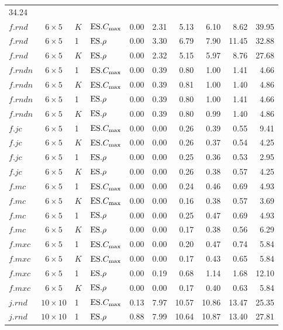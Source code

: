 \begin{table}[b]
{\begin{tabular}{lcllrrrrrr}
34.24 \\ 
$f.rnd$ & $6\times5$ & $K$ & $\text{ES}.{C_{\max}}$ & 0.00 & 2.31 & 5.13 & 6.10 & 8.62 & 
39.95 \\ 
$f.rnd$ & $6\times5$ & 1 & $\text{ES}.{\rho}$ & 0.00 & 3.30 & 6.79 & 7.90 & 11.45 & 
32.88 \\ 
$f.rnd$ & $6\times5$ & $K$ & $\text{ES}.{\rho}$ & 0.00 & 2.32 & 5.15 & 5.97 & 8.76 & 
27.68 \\ \midrule
$f.rndn$ & $6\times5$ & 1 & $\text{ES}.{C_{\max}}$ & 0.00 & 0.39 & 0.80 & 1.00 & 1.41 & 
4.66 \\ 
$f.rndn$ & $6\times5$ & $K$ & $\text{ES}.{C_{\max}}$ & 0.00 & 0.39 & 0.81 & 1.00 & 1.40 & 
4.86 \\ 
$f.rndn$ & $6\times5$ & 1 & $\text{ES}.{\rho}$ & 0.00 & 0.39 & 0.80 & 1.00 & 1.41 & 4.66 
\\ 
$f.rndn$ & $6\times5$ & $K$ & $\text{ES}.{\rho}$ & 0.00 & 0.39 & 0.80 & 0.99 & 1.40 & 
4.86 \\ \midrule
$f.jc$ & $6\times5$ & 1 & $\text{ES}.{C_{\max}}$ & 0.00 & 0.00 & 0.26 & 0.39 & 0.55 & 9.41 
\\ 
$f.jc$ & $6\times5$ & $K$ & $\text{ES}.{C_{\max}}$ & 0.00 & 0.00 & 0.26 & 0.37 & 0.54 & 
4.25 \\ 
$f.jc$ & $6\times5$ & 1 & $\text{ES}.{\rho}$ & 0.00 & 0.00 & 0.25 & 0.36 & 0.53 & 2.95 
\\ 
$f.jc$ & $6\times5$ & $K$ & $\text{ES}.{\rho}$ & 0.00 & 0.00 & 0.26 & 0.38 & 0.57 & 4.25 
\\ \midrule
$f.mc$ & $6\times5$ & 1 & $\text{ES}.{C_{\max}}$ & 0.00 & 0.00 & 0.24 & 0.46 & 0.69 & 4.93 
\\ 
$f.mc$ & $6\times5$ & $K$ & $\text{ES}.{C_{\max}}$ & 0.00 & 0.00 & 0.16 & 0.38 & 0.57 & 
3.69 \\ 
$f.mc$ & $6\times5$ & 1 & $\text{ES}.{\rho}$ & 0.00 & 0.00 & 0.25 & 0.47 & 0.69 & 4.93 
\\ 
$f.mc$ & $6\times5$ & $K$ & $\text{ES}.{\rho}$ & 0.00 & 0.00 & 0.17 & 0.38 & 0.56 & 6.29 
\\ \midrule
$f.mxc$ & $6\times5$ & 1 & $\text{ES}.{C_{\max}}$ & 0.00 & 0.00 & 0.20 & 0.47 & 0.74 & 5.84 
\\ 
$f.mxc$ & $6\times5$ & $K$ & $\text{ES}.{C_{\max}}$ & 0.00 & 0.00 & 0.17 & 0.43 & 0.65 & 
5.84 \\ 
$f.mxc$ & $6\times5$ & 1 & $\text{ES}.{\rho}$ & 0.00 & 0.19 & 0.68 & 1.14 & 1.68 & 12.10 
\\ 
$f.mxc$ & $6\times5$ & $K$ & $\text{ES}.{\rho}$ & 0.00 & 0.00 & 0.17 & 0.40 & 0.63 & 
5.84 \\ \midrule
$j.rnd$ & $10\times10$ & 1 & $\text{ES}.{C_{\max}}$ & 0.13 & 7.97 & 10.57 & 10.86 & 13.47 & 
25.35 \\ 
$j.rnd$ & $10\times10$ & 1 & $\text{ES}.{\rho}$ & 0.88 & 7.99 & 10.64 & 10.87 & 13.40 & 
27.81 \\ 
\bottomrule
\end{tabular}}
\end{table}


